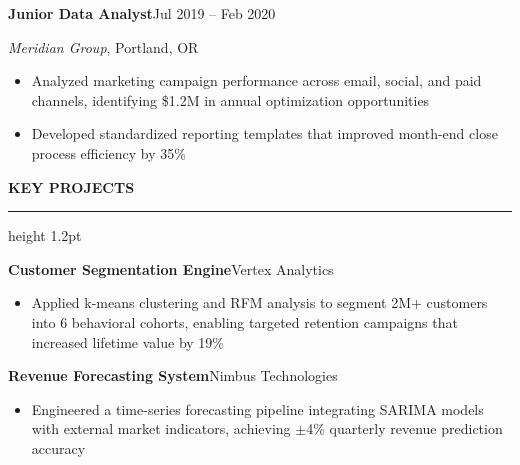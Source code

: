 \documentclass[10pt,letterpaper]{article}
\newcommand{\mainsection}[1]{%
  \vspace{6pt}%
  {\large\bfseries\sffamily\color{primary}#1}\par
  \vspace{2pt}%
  {\color{accent}\hrule height 1.2pt}\par
  \vspace{4pt}%
}
\newcommand{\experience}[4]{%
  {\bfseries\sffamily\small #1}\hfill{\footnotesize\sffamily\color{darktext}#4}\par
  {\itshape\sffamily\color{darktext}\small#2}, #3\par\vspace{1pt}%
}
\begin{document}
\begin{minipage}[t]{0.67\textwidth}
\vspace{3pt}

\experience{Junior Data Analyst}{Meridian Group}{Portland, OR}{Jul 2019 -- Feb 2020}
\begin{itemize}
  \item {\small\sffamily Analyzed marketing campaign performance across email, social, and paid channels, identifying \$1.2M in annual optimization opportunities}
  \item {\small\sffamily Developed standardized reporting templates that improved month-end close process efficiency by 35\%}
\end{itemize}

\mainsection{KEY PROJECTS}

{\bfseries\small\sffamily Customer Segmentation Engine}\hfill{\footnotesize\sffamily\color{darktext}Vertex Analytics}\par
\begin{itemize}
  \item {\small\sffamily Applied k-means clustering and RFM analysis to segment 2M+ customers into 6 behavioral cohorts, enabling targeted retention campaigns that increased lifetime value by 19\%}
\end{itemize}

\vspace{2pt}

{\bfseries\small\sffamily Revenue Forecasting System}\hfill{\footnotesize\sffamily\color{darktext}Nimbus Technologies}\par
\begin{itemize}
  \item {\small\sffamily Engineered a time-series forecasting pipeline integrating SARIMA models with external market indicators, achieving $\pm$4\% quarterly revenue prediction accuracy}
\end{itemize}

\end{minipage}
\end{document}
